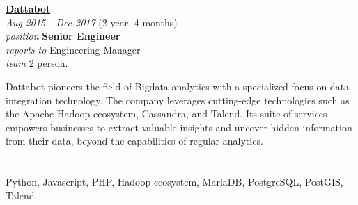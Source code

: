 \documentclass[12pt]{res} %
\begin{document}
\begin{resume}
\vspace{16pt} %
\begin{minipage}[t]{6.5cm}
\begin{flushleft}
	{\large {\bf \href{https://dattabot.io}{Dattabot}}} \\
	{\footnotesize{\sl Aug 2015 - Dec 2017} \hfill (2 year, 4 months)}\\
	{\footnotesize{\sl position} \hfill \bf{Senior Engineer}}\\
	{\footnotesize{\sl reports to} \hfill Engineering Manager}\\
	{\footnotesize{\sl team} \hfill 2 person.}\\
\end{flushleft}
\end{minipage}
\hspace{0.5cm}
\begin{minipage}[t]{0.56\linewidth}
	Dattabot pioneers the field of Bigdata analytics with a specialized focus on data integration technology. The company leverages cutting-edge technologies such as the Apache Hadoop ecosystem, Cassandra, and Talend. Its suite of services empowers businesses to extract valuable insights and uncover hidden information from their data, beyond the capabilities of regular analytics.
\end{minipage}

	\section{}
	\vspace{-10pt}
	\begin{flushleft}
		Python, Javascript, PHP, Hadoop ecosystem, MariaDB, PostgreSQL, PostGIS, Talend
	\end{flushleft}


\end{resume}
\end{document}
